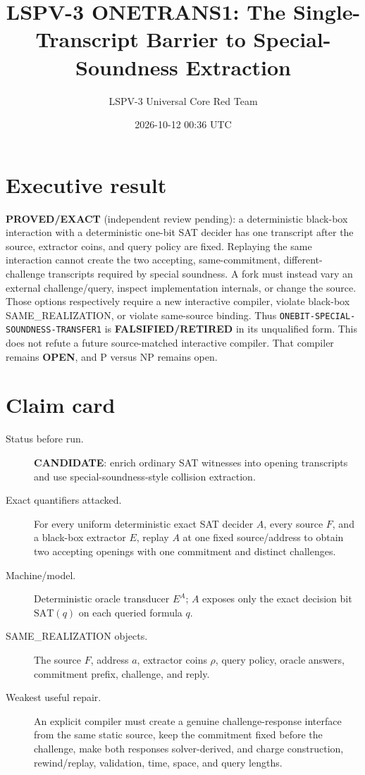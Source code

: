 \documentclass[11pt]{article}
\title{LSPV-3 ONETRANS1: The Single-Transcript Barrier to Special-Soundness Extraction}
\author{LSPV-3 Universal Core Red Team}
\date{2026-10-12 00:36 UTC}
\newcommand{\st}[1]{\textbf{#1}}
\begin{document}
\maketitle

\section*{Executive result}

\st{PROVED/EXACT} (independent review pending): a deterministic black-box
interaction with a deterministic one-bit SAT decider has one transcript after
the source, extractor coins, and query policy are fixed.  Replaying the same
interaction cannot create the two accepting, same-commitment,
different-challenge transcripts required by special soundness.  A fork must
instead vary an external challenge/query, inspect implementation internals, or
change the source.  Those options respectively require a new interactive
compiler, violate black-box SAME\_REALIZATION, or violate same-source binding.
Thus \texttt{ONEBIT-SPECIAL-SOUNDNESS-TRANSFER1} is
\st{FALSIFIED/RETIRED} in its unqualified form.  This does not refute a future
source-matched interactive compiler.  That compiler remains \st{OPEN}, and P
versus NP remains open.

\section*{Claim card}

\begin{description}
\item[Status before run.] \st{CANDIDATE}: enrich ordinary SAT witnesses into
opening transcripts and use special-soundness-style collision extraction.
\item[Exact quantifiers attacked.] For every uniform deterministic exact SAT
decider $A$, every source $F$, and a black-box extractor $E$, replay $A$ at one
fixed source/address to obtain two accepting openings with one commitment and
distinct challenges.
\item[Machine/model.] Deterministic oracle transducer $E^{A}$; $A$ exposes only
the exact decision bit $\mathrm{SAT}(q)$ on each queried formula $q$.
\item[SAME\_REALIZATION objects.] The source $F$, address $a$, extractor coins
$\rho$, query policy, oracle answers, commitment prefix, challenge, and reply.
\item[Weakest useful repair.] An explicit compiler must create a genuine
challenge-response interface from the same static source, keep the commitment
fixed before the challenge, make both responses solver-derived, and charge
construction, rewind/replay, validation, time, space, and query lengths.
\end{description}
\end{document}

